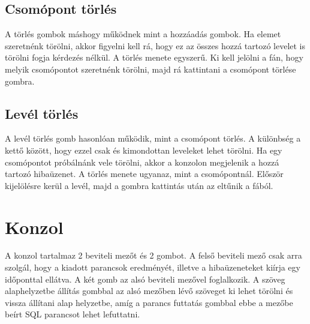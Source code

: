 \subsection{Csomópont törlés} A törlés gombok máshogy működnek mint a hozzáadás gombok. Ha elemet szeretnénk törölni, akkor figyelni kell rá, hogy ez az összes hozzá tartozó levelet is törölni fogja kérdezés nélkül. A törlés menete egyszerű. Ki kell jelölni a fán, hogy melyik csomópontot szeretnénk törölni, majd rá kattintani a csomópont törlése gombra.

\subsection{Levél törlés} A levél törlés gomb hasonlóan működik, mint a csomópont törlés. A különbség a kettő között, hogy ezzel csak és kimondottan leveleket lehet törölni. Ha egy csomópontot próbálnánk vele törölni, akkor a konzolon megjelenik a hozzá tartozó hibaüzenet. A törlés menete ugyanaz, mint a csomópontnál. Először kijelölésre kerül a levél, majd a gombra kattintás után az eltűnik a fából.

\section{Konzol} A konzol tartalmaz 2 beviteli mezőt és 2 gombot. A felső beviteli mező csak arra szolgál, hogy a kiadott parancsok eredményét, illetve a hibaüzeneteket kiírja egy időponttal ellátva. A két gomb az alsó beviteli mezővel foglalkozik. A szöveg alaphelyzetbe állítás gombbal az alsó mezőben lévő szöveget ki lehet törölni és vissza állítani alap helyzetbe, amíg a parancs futtatás gombbal ebbe a mezőbe beírt SQL parancsot lehet lefuttatni.


